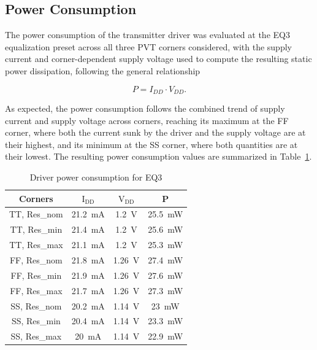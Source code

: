 \subsection{Power Consumption}

The power consumption of the transmitter driver was evaluated at the EQ3 equalization preset across all three \ac{PVT} corners considered, with the supply current and corner-dependent supply voltage used to compute the resulting static power dissipation, following the general relationship

\begin{equation}
  P = I_{DD} \cdot V_{DD}.
  \label{eq:pvi}
\end{equation}

As expected, the power consumption follows the combined trend of supply current and supply voltage across corners, reaching its maximum at the \ac{FF} corner, where both the current sunk by the driver and the supply voltage are at their highest, and its minimum at the \ac{SS} corner, where both quantities are at their lowest. The resulting power consumption values are summarized in Table~\ref{tab:power_consumption}.

\begin{table}[htbp]
 \centering
 \caption{Driver power consumption for EQ3}
 \label{tab:power_consumption}
 \begin{tabular}{cccc}
  \hline \hline
  \textbf{Corners} & \textbf{$\mathrm{I_{DD}}$} & \textbf{$\mathrm{V_{DD}}$} & \textbf{P}\\
  \hline
  \ac{TT}, Res\_nom & \SI{21.2}{\milli\ampere} & \SI{1.2}{\volt} & \SI{25.5}{\milli\watt} \\
  \ac{TT}, Res\_min & \SI{21.4}{\milli\ampere} & \SI{1.2}{\volt} & \SI{25.6}{\milli\watt} \\
  \ac{TT}, Res\_max & \SI{21.1}{\milli\ampere} & \SI{1.2}{\volt} & \SI{25.3}{\milli\watt} \\
  \ac{FF}, Res\_nom & \SI{21.8}{\milli\ampere} & \SI{1.26}{\volt} & \SI{27.4}{\milli\watt} \\
  \ac{FF}, Res\_min & \SI{21.9}{\milli\ampere} & \SI{1.26}{\volt} & \SI{27.6}{\milli\watt} \\
  \ac{FF}, Res\_max & \SI{21.7}{\milli\ampere} & \SI{1.26}{\volt} & \SI{27.3}{\milli\watt} \\
  \ac{SS}, Res\_nom & \SI{20.2}{\milli\ampere} & \SI{1.14}{\volt} & \SI{23}{\milli\watt} \\
  \ac{SS}, Res\_min & \SI{20.4}{\milli\ampere} & \SI{1.14}{\volt} & \SI{23.3}{\milli\watt} \\
  \ac{SS}, Res\_max & \SI{20}{\milli\ampere} & \SI{1.14}{\volt} & \SI{22.9}{\milli\watt} \\
  \hline \hline
 \end{tabular}
\end{table}

